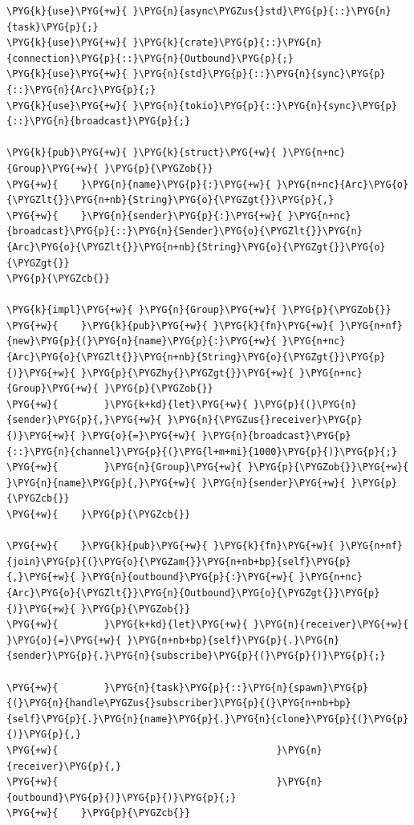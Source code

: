 \begin{Verbatim}[commandchars=\\\{\},breaklines=true,breakanywhere=true,fontsize=\codefont,xleftmargin=17bp]
\PYG{k}{use}\PYG{+w}{ }\PYG{n}{async\PYGZus{}std}\PYG{p}{::}\PYG{n}{task}\PYG{p}{;}
\PYG{k}{use}\PYG{+w}{ }\PYG{k}{crate}\PYG{p}{::}\PYG{n}{connection}\PYG{p}{::}\PYG{n}{Outbound}\PYG{p}{;}
\PYG{k}{use}\PYG{+w}{ }\PYG{n}{std}\PYG{p}{::}\PYG{n}{sync}\PYG{p}{::}\PYG{n}{Arc}\PYG{p}{;}
\PYG{k}{use}\PYG{+w}{ }\PYG{n}{tokio}\PYG{p}{::}\PYG{n}{sync}\PYG{p}{::}\PYG{n}{broadcast}\PYG{p}{;}

\PYG{k}{pub}\PYG{+w}{ }\PYG{k}{struct}\PYG{+w}{ }\PYG{n+nc}{Group}\PYG{+w}{ }\PYG{p}{\PYGZob{}}
\PYG{+w}{    }\PYG{n}{name}\PYG{p}{:}\PYG{+w}{ }\PYG{n+nc}{Arc}\PYG{o}{\PYGZlt{}}\PYG{n+nb}{String}\PYG{o}{\PYGZgt{}}\PYG{p}{,}
\PYG{+w}{    }\PYG{n}{sender}\PYG{p}{:}\PYG{+w}{ }\PYG{n+nc}{broadcast}\PYG{p}{::}\PYG{n}{Sender}\PYG{o}{\PYGZlt{}}\PYG{n}{Arc}\PYG{o}{\PYGZlt{}}\PYG{n+nb}{String}\PYG{o}{\PYGZgt{}}\PYG{o}{\PYGZgt{}}
\PYG{p}{\PYGZcb{}}

\PYG{k}{impl}\PYG{+w}{ }\PYG{n}{Group}\PYG{+w}{ }\PYG{p}{\PYGZob{}}
\PYG{+w}{    }\PYG{k}{pub}\PYG{+w}{ }\PYG{k}{fn}\PYG{+w}{ }\PYG{n+nf}{new}\PYG{p}{(}\PYG{n}{name}\PYG{p}{:}\PYG{+w}{ }\PYG{n+nc}{Arc}\PYG{o}{\PYGZlt{}}\PYG{n+nb}{String}\PYG{o}{\PYGZgt{}}\PYG{p}{)}\PYG{+w}{ }\PYG{p}{\PYGZhy{}\PYGZgt{}}\PYG{+w}{ }\PYG{n+nc}{Group}\PYG{+w}{ }\PYG{p}{\PYGZob{}}
\PYG{+w}{        }\PYG{k+kd}{let}\PYG{+w}{ }\PYG{p}{(}\PYG{n}{sender}\PYG{p}{,}\PYG{+w}{ }\PYG{n}{\PYGZus{}receiver}\PYG{p}{)}\PYG{+w}{ }\PYG{o}{=}\PYG{+w}{ }\PYG{n}{broadcast}\PYG{p}{::}\PYG{n}{channel}\PYG{p}{(}\PYG{l+m+mi}{1000}\PYG{p}{)}\PYG{p}{;}
\PYG{+w}{        }\PYG{n}{Group}\PYG{+w}{ }\PYG{p}{\PYGZob{}}\PYG{+w}{ }\PYG{n}{name}\PYG{p}{,}\PYG{+w}{ }\PYG{n}{sender}\PYG{+w}{ }\PYG{p}{\PYGZcb{}}
\PYG{+w}{    }\PYG{p}{\PYGZcb{}}

\PYG{+w}{    }\PYG{k}{pub}\PYG{+w}{ }\PYG{k}{fn}\PYG{+w}{ }\PYG{n+nf}{join}\PYG{p}{(}\PYG{o}{\PYGZam{}}\PYG{n+nb+bp}{self}\PYG{p}{,}\PYG{+w}{ }\PYG{n}{outbound}\PYG{p}{:}\PYG{+w}{ }\PYG{n+nc}{Arc}\PYG{o}{\PYGZlt{}}\PYG{n}{Outbound}\PYG{o}{\PYGZgt{}}\PYG{p}{)}\PYG{+w}{ }\PYG{p}{\PYGZob{}}
\PYG{+w}{        }\PYG{k+kd}{let}\PYG{+w}{ }\PYG{n}{receiver}\PYG{+w}{ }\PYG{o}{=}\PYG{+w}{ }\PYG{n+nb+bp}{self}\PYG{p}{.}\PYG{n}{sender}\PYG{p}{.}\PYG{n}{subscribe}\PYG{p}{(}\PYG{p}{)}\PYG{p}{;}

\PYG{+w}{        }\PYG{n}{task}\PYG{p}{::}\PYG{n}{spawn}\PYG{p}{(}\PYG{n}{handle\PYGZus{}subscriber}\PYG{p}{(}\PYG{n+nb+bp}{self}\PYG{p}{.}\PYG{n}{name}\PYG{p}{.}\PYG{n}{clone}\PYG{p}{(}\PYG{p}{)}\PYG{p}{,}
\PYG{+w}{                                      }\PYG{n}{receiver}\PYG{p}{,}
\PYG{+w}{                                      }\PYG{n}{outbound}\PYG{p}{)}\PYG{p}{)}\PYG{p}{;}
\PYG{+w}{    }\PYG{p}{\PYGZcb{}}


\end{Verbatim}
